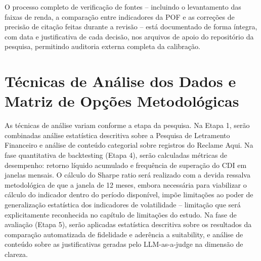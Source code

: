 O processo completo de verifica\c{c}\~ao de fontes -- incluindo o
levantamento das faixas de renda, a compara\c{c}\~ao entre indicadores
da POF e as corre\c{c}\~oes de precis\~ao de cita\c{c}\~ao feitas
durante a revis\~ao -- est\'a documentado de forma \'integra, com data
e justificativa de cada decis\~ao, nos arquivos de apoio do
reposit\'orio da pesquisa, permitindo auditoria externa completa da
calibra\c{c}\~ao.

\section{T\'ecnicas de An\'alise dos Dados e Matriz de Op\c{c}\~oes Metodol\'ogicas}
\label{sec:analise-matriz}

As t\'ecnicas de an\'alise variam conforme a etapa da pesquisa. Na Etapa
1, ser\~ao combinadas an\'alise estat\'istica descritiva sobre a Pesquisa
de Letramento Financeiro e an\'alise de conte\'udo categorial
\autocite{bardin2011} sobre registros do Reclame Aqui. Na fase
quantitativa de backtesting (Etapa 4), ser\~ao calculadas m\'etricas de
desempenho: retorno l\'iquido acumulado e frequ\^encia de supera\c{c}\~ao
do CDI em janelas mensais. O c\'alculo do Sharpe ratio ser\'a realizado
com a devida ressalva metodol\'ogica de que a janela de 12 meses, embora
necess\'aria para viabilizar o c\'alculo do indicador dentro do per\'iodo
dispon\'ivel, imp\~oe limita\c{c}\~oes ao poder de generaliza\c{c}\~ao
estat\'istica dos indicadores de volatilidade -- limita\c{c}\~ao que ser\'a
explicitamente reconhecida no cap\'itulo de limita\c{c}\~oes do estudo. Na
fase de avalia\c{c}\~ao (Etapa 5), ser\~ao aplicadas estat\'istica
descritiva sobre os resultados da compara\c{c}\~ao automatizada de
fidelidade e ader\^encia a suitability, e an\'alise de conte\'udo sobre
as justificativas geradas pelo LLM-as-a-judge na dimens\~ao de clareza.

